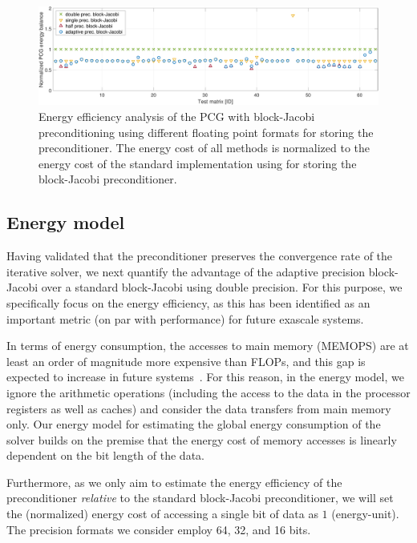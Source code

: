 \begin{figure}
\begin{center}
\includegraphics[width=\textwidth]{plots/fcg_energy_rel_adapt}
\caption{Energy efficiency analysis of the PCG with block-Jacobi preconditioning
	using different floating point formats for storing the preconditioner. The
	energy cost of all methods is normalized to the energy cost of the standard
	implementation using \fpd for storing the block-Jacobi preconditioner.}
\label{2017-adaptive-block-jacobi:fig:energyanalysis}
\end{center}
\end{figure}

\subsection{Energy model}

Having validated that the \apbj preconditioner preserves the convergence rate of
the iterative solver, we next quantify the advantage of the adaptive precision
block-Jacobi over a standard block-Jacobi using double precision. For this
purpose, we specifically focus on the  energy efficiency, as this has been
identified as an important metric (on par with performance) for future exascale
systems.

In terms of energy consumption, the accesses to main memory (MEMOPS)
are at least an order
of magnitude more expensive than FLOPs, and this gap is
expected to increase in future systems~\cite{shalf}.
For this reason, in the energy model, we ignore the arithmetic operations
(including the access to the data in the processor registers as well as caches)
and consider the data transfers from main memory only. Our energy model for
estimating the global energy consumption of the solver builds on the premise
that the energy cost of memory accesses is linearly dependent on the bit length
of the data.

Furthermore, as we only aim to estimate the energy efficiency of the \apbj
preconditioner \textit{relative} to the standard \fpd block-Jacobi
preconditioner, we will set the (normalized) energy cost of accessing a single
bit of data as $1$ (energy-unit). The precision formats we consider employ 64, 
32,
and 16 bits.

